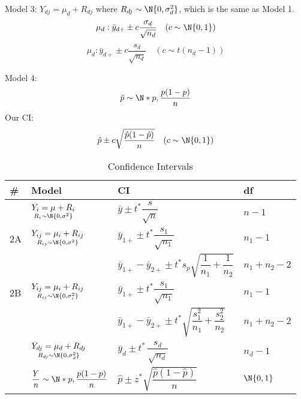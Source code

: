 \begin{Example}{}{}
    Model 3: $ Y_{dj}=\mu_d+R_{dj} $ where $ R_{dj} \sim \N{0,\sigma^2_d} $,
    which is the same as Model 1.
    \[ \mu_d:\bar{y}_{d+}\pm c \frac{\sigma_d}{\sqrt{n_d}}\quad (c \sim \N{0,1})  \]
    \[ \mu_d:\bar{y}_{d+} \pm c \frac{s_d}{\sqrt{n_d}}\quad (c\sim t(n_d-1))  \]
\end{Example}
\begin{Example}{}{}
    Model 4:
    \[ \tilde{p} \sim \N*{p,\frac{p(1-p)}{n}} \]
    Our CI\@:
    \[ \hat{p}\pm c\sqrt{\frac{\hat{p}(1-\hat{p})}{n}}\quad(c \sim \N{0,1}) \]
\end{Example}
\begin{table}[!htbp]
    \centering
    \caption{Confidence Intervals}
    \begin{tabularx}{0.95\linewidth}{@{}>{\hsize}YYYY@{}}
        \toprule
        \# & Model                                                            & CI                                                                               & df            \\
          & $ \underset{R_i \sim \N{0,\sigma^2}}{Y_i=\mu+R_i} $              & $ \bar{y}\pm t^* \dfrac{s}{\sqrt{n}} $                                           & $ n-1 $       \\
        \midrule
        2A & $ \underset{R_{ij} \sim \N{0,\sigma^2}}{Y_{ij}=\mu_i+R_{ij}} $   & $ \bar{y}_{1+} \pm t^*\dfrac{s_1}{\sqrt{n_1}} $                                  & $ n_1-1 $     \\
           &                                                                  & $ \bar{y}_{1+}-\bar{y}_{2+}\pm t^* s_p\sqrt{\dfrac{1}{n_1}+\dfrac{1}{n_2}} $     & $ n_1+n_2-2 $ \\
        \midrule
        2B & $ \underset{R_{ij} \sim \N{0,\sigma_i^2}}{Y_{ij}=\mu_i+R_{ij}} $ & $ \bar{y}_{1+} \pm t^*\dfrac{s_1}{\sqrt{n_1}} $                                  & $ n_1-1 $     \\
           &                                                                  & $ \bar{y}_{1+}-\bar{y}_{2+}\pm t^*\sqrt{\dfrac{s_1^2}{n_1}+\dfrac{s_2^2}{n_2}} $ & $ n_1+n_2-2 $ \\
          & $ \underset{R_{dj} \sim \N{0,\sigma_d^2}}{Y_{dj}=\mu_d+R_{dj}} $ & $ \bar{y}_d\pm t^*\, \dfrac{s_d}{\sqrt{n_d}}  $                                  & $ n_d-1 $     \\
          & $ \dfrac{Y}{n}\sim \N*{p,\dfrac{p(1-p)}{n}} $                    & $ \hat{p}\pm z^*\sqrt{\dfrac{\hat{p}(1-\hat{p})}{n}} $                           & $ \N{0,1} $
    \end{tabularx}
\end{table}

